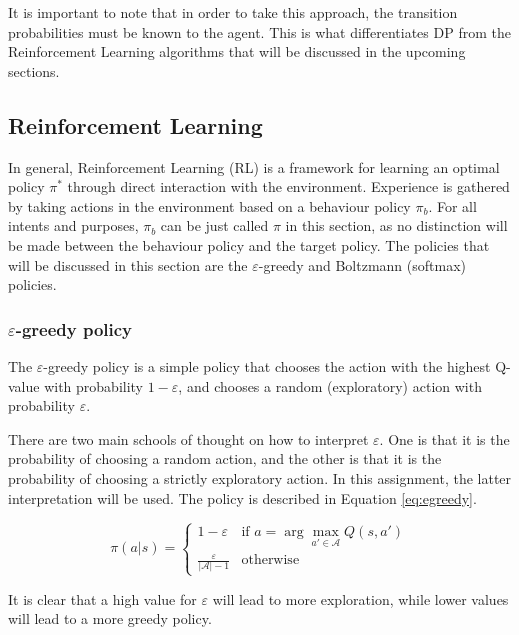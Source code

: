 \documentclass{article}
\begin{document}
It is important to note that in order to take this approach, the transition probabilities must be known to the agent.
This is what differentiates DP from the Reinforcement Learning algorithms that will be discussed in the upcoming sections.

\subsection{Reinforcement Learning}
\label{ssec:rl}

In general, Reinforcement Learning (RL) is a framework for learning an optimal policy $\pi^*$ through direct interaction with the environment.
Experience is gathered by taking actions in the environment based on a behaviour policy $\pi_b$.
For all intents and purposes, $\pi_b$ can be just called $\pi$ in this section, as no distinction will be made between the behaviour policy and the target policy.
The policies that will be discussed in this section are the $\varepsilon$-greedy and Boltzmann (softmax) policies.

\subsubsection*{$\varepsilon$-greedy policy}
\label{sssec:egreedy}

The $\varepsilon$-greedy policy is a simple policy that chooses the action with the highest Q-value with probability $1 - \varepsilon$, and chooses a random (exploratory) action with probability $\varepsilon$.

\newpage

There are two main schools of thought on how to interpret $\varepsilon$.
One is that it is the probability of choosing a random action, and the other is that it is the probability of choosing a strictly exploratory action.
In this assignment, the latter interpretation will be used.
The policy is described in Equation \ref{eq:egreedy}.

\begin{equation}
    \pi(a | s) = \begin{cases}
        1 - \varepsilon & \text{if } a = \arg \max_{a' \in \mathcal{A}} Q(s, a') \\
        \frac{\varepsilon}{|\mathcal{A}|-1} & \text{otherwise}
    \end{cases}
\label{eq:egreedy}
\end{equation}

It is clear that a high value for $\varepsilon$ will lead to more exploration, while lower values will lead to a more greedy policy.
\end{document}
